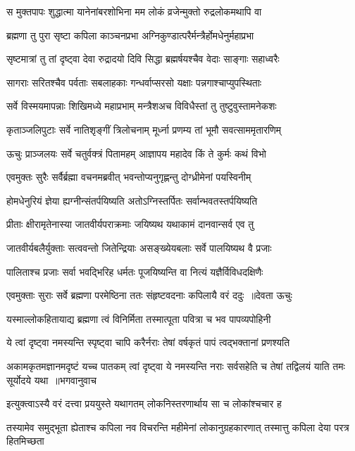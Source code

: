 \twolineshloka
{स मुक्तपापः शुद्धात्मा यानेनांबरशोभिना}
{मम लोकं व्रजेन्मुक्तो रुद्रलोकमथापि वा}


\twolineshloka
{ब्रह्मणा तु पुरा सृष्टा कपिला काञ्चनप्रभा}
{अग्निकुण्डात्परैर्मन्त्रैर्होमधेनुर्महाप्रभा}


\twolineshloka
{सृष्टमात्रां तु तां दृष्ट्वा देवा रुद्रादयो दिवि}
{सिद्धा ब्रह्मर्षयश्चैव वेदाः साङ्गाः सहाध्वरैः}


\twolineshloka
{सागराः सरितश्चैव पर्वताः सबलाहकाः}
{गन्धर्वाप्सरसो यक्षाः पन्नगाश्चाप्युपस्थिताः}


\twolineshloka
{सर्वे विस्मयमापन्नाः शिखिमध्ये महाप्रभाम्}
{मन्त्रैशअच विविधैस्तां तु तुष्टुवुस्तामनेकशः}


\twolineshloka
{कृताञ्जलिपुटाः सर्वे नातिशृङ्गीं त्रिलोचनाम्}
{मूर्ध्ना प्रणम्य तां भूमौ सवत्साममृतारणिम्}


\twolineshloka
{ऊचुः प्राञ्जलयः सर्वे चतुर्वक्त्रं पितामहम्}
{आज्ञापय महादेव किं ते कुर्मः कथं विभो}


\twolineshloka
{एवमुक्तः सुरैः सर्वैर्ब्रह्मा वचनमब्रवीत्}
{भवन्तोप्यनुगृह्णन्तु दोग्ध्रीमेनां पयस्विनीम्}


\twolineshloka
{होमधेनुरियं ज्ञेया ह्यग्नीन्संतर्पयिष्यति}
{अतोऽग्निस्तर्पितः सर्वान्भवतस्तर्पयिष्यति}


\twolineshloka
{प्रीताः क्षीरामृतेनास्या जातवीर्यपराक्रमाः}
{जयिष्यथ यथाकामं दानवान्सर्व एव तु}


\twolineshloka
{जातवीर्यबलैर्युक्ताः सत्ववन्तो जितेन्द्रियाः}
{असङ्ख्येयबलाः सर्वे पालयिष्यथ वै प्रजाः}


\twolineshloka
{पालिताश्च प्रजाः सर्वा भवद्भिरिह धर्मतः}
{पूजयिष्यन्ति वा नित्यं यज्ञैर्विविधदक्षिणैः}


\threelineshloka
{एवमुक्ताः सुराः सर्वे ब्रह्मणा परमेष्ठिना}
{ततः संहृष्टवदनाः कपिलायै वरं ददुः ॥देवता ऊचुः}
{}


\twolineshloka
{यस्माल्लोकहितायाद्य ब्रह्मणा त्वं विनिर्मिता}
{तस्मात्पूता पवित्रा च भव पापव्यपोहिनी}


\twolineshloka
{ये त्वां दृष्ट्वा नमस्यन्ति स्पृष्ट्वा चापि करैर्नराः}
{तेषां वर्षकृतं पापं त्वद्भक्तानां प्रणश्यति}


\fourlineindentedshloka
{अकामकृतमज्ञानमदृष्टं यच्च पातकम्}
{त्वां दृष्ट्वा ये नमस्यन्ति नराः सर्वसहेति च}
{तेषां तद्विलयं याति तमः सूर्योदये यथा ॥भगवानुवाच}
{}


\twolineshloka
{इत्युक्त्वाऽस्यै वरं दत्त्वा प्रययुस्ते यथागतम्}
{लोकनिस्तरणार्थाय सा च लोकांश्चचार ह}


\threelineshloka
{तस्यामेव समुद्भूता ह्येताश्च कपिला नव}
{विचरन्ति महीमेनां लोकानुग्रहकारणात्}
{तस्मात्तु कपिला देया परत्र हितमिच्छता}


